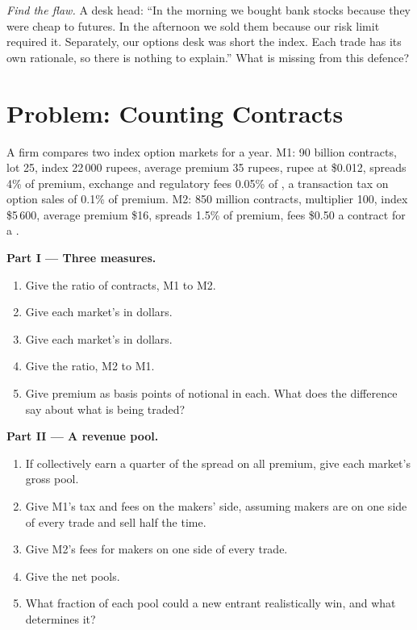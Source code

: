 \begin{exercise}[$\star\star\star$]\label{exo:m1:options-markets-europe-asia:8}
\emph{Find the flaw.} A desk head: ``In the morning we bought bank stocks
because they were cheap to futures. In the afternoon we sold them because our
risk limit required it. Separately, our options desk was short the index.
Each trade has its own rationale, so there is nothing to explain.'' What is
missing from this defence?
\end{exercise}

\section{Problem: Counting Contracts}

\begin{problem}\label{pb:m1:options-markets-europe-asia:1}
A firm compares two index option markets for a year. M1: 90 billion
contracts, lot 25, index 22\,000 rupees, average premium 35 rupees, rupee at
\$0.012, spreads 4\% of premium, exchange and regulatory fees 0.05\% of , a transaction tax on option sales of 0.1\% of premium. M2: 850
million contracts, multiplier 100, index \$5\,600, average premium \$16,
spreads 1.5\% of premium, fees \$0.50 a contract for a .

\medskip\noindent\textbf{Part I --- Three measures.}
\begin{enumerate}
\item Give the ratio of contracts, M1 to M2.
\item Give each market's  in dollars.
\item Give each market's  in dollars.
\item Give the  ratio, M2 to M1.
\item Give premium as basis points of notional in each. What does the
difference say about what is being traded?
\end{enumerate}

\medskip\noindent\textbf{Part II --- A revenue pool.}
\begin{enumerate}[resume]
\item If  collectively earn a quarter of the spread on all
premium, give each market's gross pool.
\item Give M1's tax and fees on the makers' side, assuming makers are on one
side of every trade and sell half the time.
\item Give M2's fees for makers on one side of every trade.
\item Give the net pools.
\item What fraction of each pool could a new entrant realistically win, and
what determines it?
\end{enumerate}


\end{problem}
